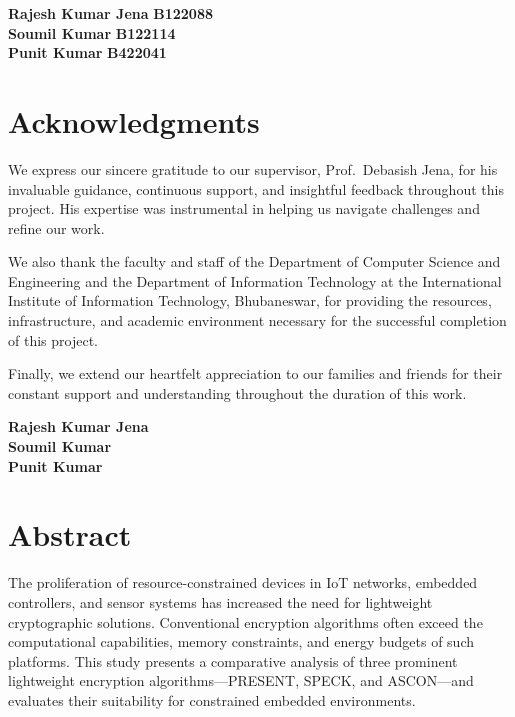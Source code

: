\documentclass[12pt]{report}
\begin{document}
\vspace{1cm}

\noindent \textbf{Rajesh Kumar Jena} \hfill \textbf{B122088}\\
\textbf{Soumil Kumar} \hfill \textbf{B122114}\\
\textbf{Punit Kumar} \hfill \textbf{B422041}

\newpage
\chapter*{Acknowledgments}

We express our sincere gratitude to our supervisor, Prof.\ Debasish Jena, for his invaluable
guidance, continuous support, and insightful feedback throughout this project. His expertise
was instrumental in helping us navigate challenges and refine our work.

We also thank the faculty and staff of the Department of Computer Science and Engineering and
the Department of Information Technology at the International Institute of Information
Technology, Bhubaneswar, for providing the resources, infrastructure, and academic environment
necessary for the successful completion of this project.

Finally, we extend our heartfelt appreciation to our families and friends for their constant
support and understanding throughout the duration of this work.

\vspace{1cm}

\noindent \textbf{Rajesh Kumar Jena}\\
\textbf{Soumil Kumar}\\
\textbf{Punit Kumar}

\newpage
\chapter*{Abstract}

The proliferation of resource-constrained devices in IoT networks, embedded controllers,
and sensor systems has increased the need for lightweight cryptographic solutions.
Conventional encryption algorithms often exceed the computational capabilities, memory
constraints, and energy budgets of such platforms. This study presents a comparative
analysis of three prominent lightweight encryption algorithms—PRESENT, SPECK, and
ASCON—and evaluates their suitability for constrained embedded environments.
\end{document}
